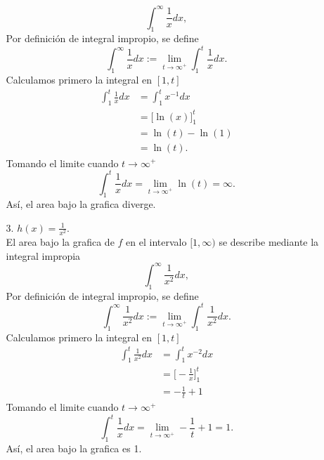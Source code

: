 \documentclass[12pt,a4paper]{article}
\begin{document}
\begin{solucion}
\begin{enumerate}
\begin{enumerate}
                \begin{equation*}
                    \int_{1}^{\infty}\frac{1}{x}dx,
                \end{equation*}
                Por definición de integral impropio, se define
                \begin{equation*}
                    \int_{1}^{\infty}\frac{1}{x}dx:=\lim_{t\to\infty^{+}}\int_{1}^{t}\frac{1}{x}dx.
                \end{equation*}
                Calculamos primero la integral en $[1,t]$
                \begin{align*}
                    \int_{1}^{t}\frac{1}{x}dx&=\int_{1}^{t}x^{-1}dx\\
                    &=\big[\ln(x)\big]_{1}^{t}\\
                    &=\ln(t)-\ln(1)\\
                    &=\ln(t).
                \end{align*}
                Tomando el limite cuando $t\to\infty^{+}$
                \begin{equation*}
                    \int_{1}^{t}\frac{1}{x}dx=\lim_{t\to\infty^{+}}\ln(t)=\infty.
                \end{equation*}
                Así, el area bajo la grafica diverge.
                \item[3.] $h(x)=\frac{1}{x^{2}}$.\\
                El area bajo la grafica de $f$ en el intervalo $[1,\infty)$ se describe mediante la integral impropia
                \begin{equation*}
                    \int_{1}^{\infty}\frac{1}{x^{2}}dx,
                \end{equation*}
                Por definición de integral impropio, se define
                \begin{equation*}
                    \int_{1}^{\infty}\frac{1}{x^{2}}dx:=\lim_{t\to\infty^{+}}\int_{1}^{t}\frac{1}{x^{2}}dx.
                \end{equation*}
                Calculamos primero la integral en $[1,t]$
                \begin{align*}
                    \int_{1}^{t}\frac{1}{x^{2}}dx&=\int_{1}^{t}x^{-2}dx\\
                    &=\big[-\frac{1}{x}\big]_{1}^{t}\\
                    &=-\frac{1}{t}+1
                \end{align*}
                Tomando el limite cuando $t\to\infty^{+}$
                \begin{equation*}
                    \int_{1}^{t}\frac{1}{x}dx=\lim_{t\to\infty^{+}}-\frac{1}{t}+1=1.
                \end{equation*}
                Así, el area bajo la grafica es 1.
            \end{enumerate}
        \end{enumerate}
    \end{solucion}
\end{document}
